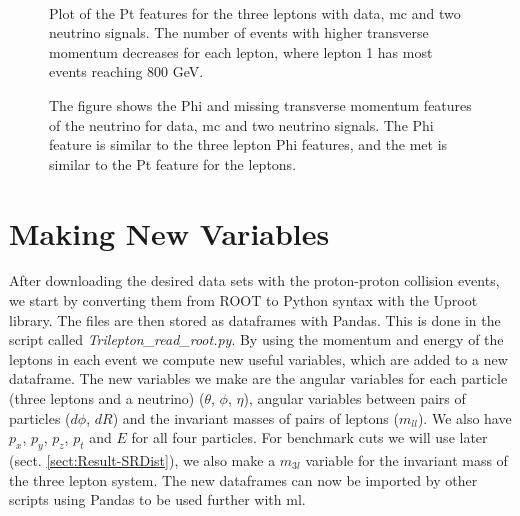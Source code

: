 \documentclass[a4paper, american, 12pt]{report}
\begin{document}
	\begin{figure}[htb!]
		\hspace*{-1.cm}
		\\
		\hspace*{3.cm}
		\caption[Pt plots for the three leptons.]{Plot of the Pt features for the three leptons with data, \acrshort{mc} and two neutrino signals. The number of events with higher transverse momentum decreases for each lepton, where lepton 1 has most events reaching 800 GeV. \label{fig:Pt_orig}}
	\end{figure}

	\begin{figure}[htb!]
		\hspace*{-0.8cm}
		\caption[Phi and missing transverse momentum plots for the neutrino.]{The figure shows the Phi and missing transverse momentum features of the neutrino for data, \acrshort{mc} and two neutrino signals. The Phi feature is similar to the three lepton Phi features, and the \acrshort{met} is similar to the Pt feature for the leptons. \label{fig:MET_orig}}
	\end{figure}


	\section{Making New Variables}
	\label{sect:Method-MakingVariables}
	After downloading the desired data sets with the proton-proton collision events, we start by converting them from ROOT to Python syntax with the Uproot library. The files are then stored as dataframes with Pandas. This is done in the script called \textit{Trilepton\_read\_root.py}. By using the momentum and energy of the leptons in each event we compute new useful variables, which are added to a new dataframe. The new variables we make are the angular variables for each particle (three leptons and a neutrino) ($\theta$, $\phi$, $\eta$), angular variables between pairs of particles ($d\phi$, $dR$) and the invariant masses of pairs of leptons ($m_{ll}$). We also have $p_x$, $p_y$, $p_z$, $p_t$ and $E$ for all four particles. For benchmark cuts we will use later (sect. \ref{sect:Result-SRDist}), we also make a $m_{3l}$ variable for the invariant mass of the three lepton system. The new dataframes can now be imported by other scripts using Pandas to be used further with \acrshort{ml}. 
	
\end{document}
